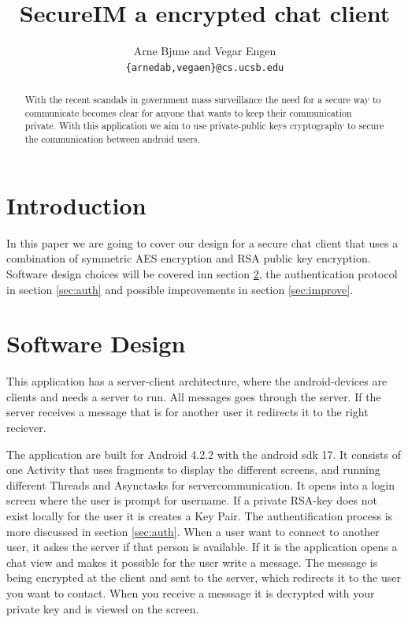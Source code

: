 \documentclass[twocolumn,11pt]{IEEEtran}
\begin{document}
\title{SecureIM a encrypted chat client}


\author{Arne Bjune and Vegar Engen \\ \texttt{\{arnedab,vegaen\}@cs.ucsb.edu}}


\maketitle

\begin{abstract}
With the recent scandals in government mass surveillance the need for a secure way to communicate becomes clear for anyone that wants to keep their communication private. With this application we aim to use private-public
 keys cryptography to secure the communication between android users. \end{abstract}

\section {Introduction}
\label{sec:introduction}
In this paper we are going to cover our design for a secure chat client that uses a combination of symmetric AES encryption and RSA public key encryption. Software design choices will be covered inn section \ref{sec:design}, the authentication protocol in section \ref{sec:auth} and possible improvements in section \ref{sec:improve}. 
\section {Software Design}
\label{sec:design}
This application has a server-client architecture, where the android-devices are clients and needs a server to run. All messages goes through the server. If the server receives a message that is for another user it redirects it to the right reciever.

The application are built for Android 4.2.2 with the android sdk 17. It consists of one Activity that uses fragments to display the different screens, and running different Threads and Asynctasks for servercommunication. It opens into a login screen where the user is prompt for username. If a private RSA-key does not exist locally for the user it is creates a Key Pair. The authentification process is more discussed in section \ref{sec:auth}. When a user want to connect to another user, it askes the server if that person is available. If it is the application opens a chat view and makes it possible for the user write a message. The message is being encrypted at the client and sent to the server, which redirects it to the user you want to contact. When you receive a messsage it is decrypted with your private key and is viewed on the screen.
\end{document}
